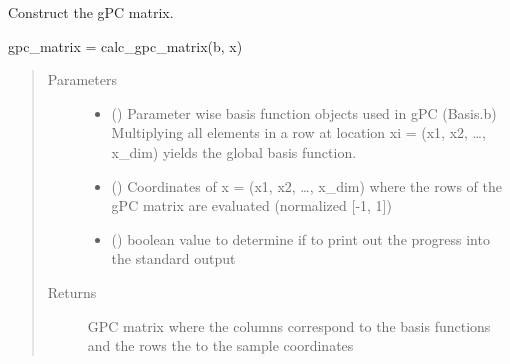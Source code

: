 \documentclass[letterpaper,10pt,english,openany,oneside]{sphinxmanual}
\begin{document}
\begin{fulllineitems}
\begin{fulllineitems}
\begin{quote}
\begin{description}
\end{description}\end{quote}

\end{fulllineitems}


\begin{fulllineitems}
\label{\detokenize{pygpc:pygpc.GPC.GPC.calc_gpc_matrix}}
Construct the gPC matrix.

gpc\_matrix = calc\_gpc\_matrix(b, x)
\begin{quote}\begin{description}
\item[{Parameters}] \leavevmode\begin{itemize}
\item {} 
 (\sphinxstyleliteralemphasis{\sphinxupquote{ {[}}}\sphinxstyleliteralemphasis{\sphinxupquote{{]}}}) \textendash{} Parameter wise basis function objects used in gPC (Basis.b)
Multiplying all elements in a row at location xi = (x1, x2, …, x\_dim) yields the global basis function.

\item {} 
 (\sphinxstyleliteralemphasis{\sphinxupquote{ {[}}}\sphinxstyleliteralemphasis{\sphinxupquote{{]}}}) \textendash{} Coordinates of x = (x1, x2, …, x\_dim) where the rows of the gPC matrix are evaluated (normalized {[}-1, 1{]})

\item {} 
 () \textendash{} boolean value to determine if to print out the progress into the standard output

\end{itemize}

\item[{Returns}] \leavevmode
{} \textendash{} GPC matrix where the columns correspond to the basis functions and the rows the to the sample coordinates


\end{description}
\end{quote}
\end{fulllineitems}
\end{fulllineitems}
\end{document}
